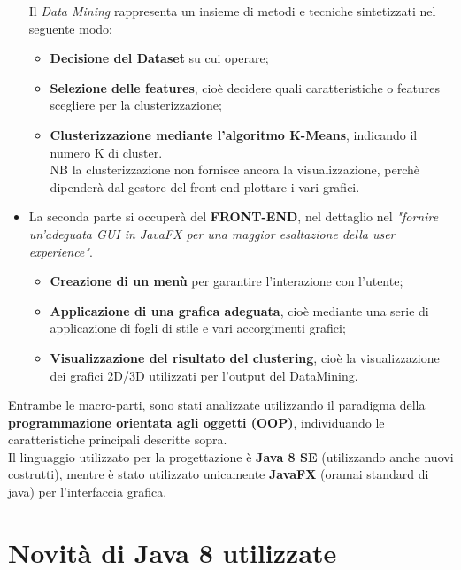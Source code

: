 \documentclass[a4paper, oneside]{book}
\begin{document}
\begin{itemize}
Il \textit{Data Mining} rappresenta un insieme di metodi e tecniche sintetizzati nel seguente modo: 
     \begin{itemize}
        \item{\textbf{Decisione del Dataset} su cui operare;}
        \item{\textbf{Selezione delle features}, cioè decidere quali caratteristiche o features scegliere per la clusterizzazione;}
        \item{\textbf{Clusterizzazione mediante l'algoritmo K-Means}, indicando il numero K di cluster.\\ NB la clusterizzazione non fornisce ancora la visualizzazione, perchè dipenderà dal gestore del front-end plottare i vari grafici.}
      \end{itemize}
\item La seconda parte si occuperà del \textbf{FRONT-END}, nel dettaglio nel \textit{"fornire un'adeguata GUI in JavaFX per una maggior esaltazione della user experience"}.
         \begin{itemize}
        \item{\textbf{Creazione di un menù} per garantire l'interazione con l'utente;}
        \item{\textbf{Applicazione di una grafica adeguata}, cioè mediante una serie di applicazione di fogli di stile e vari accorgimenti grafici;}
        \item{\textbf{Visualizzazione del risultato del clustering}, cioè la visualizzazione dei grafici 2D/3D utilizzati per l'output del DataMining.}
      \end{itemize}
\end{itemize} 
Entrambe le macro-parti, sono stati analizzate utilizzando il paradigma della \textbf{programmazione orientata agli oggetti (OOP)}, individuando le caratteristiche principali descritte sopra. \\
Il linguaggio utilizzato per la progettazione è \textbf{Java 8 SE} (utilizzando anche nuovi costrutti), mentre è stato utilizzato unicamente \textbf{JavaFX} (oramai standard di java) per l'interfaccia grafica.

\large
\section*{Novità di Java 8 utilizzate}
\end{document}
